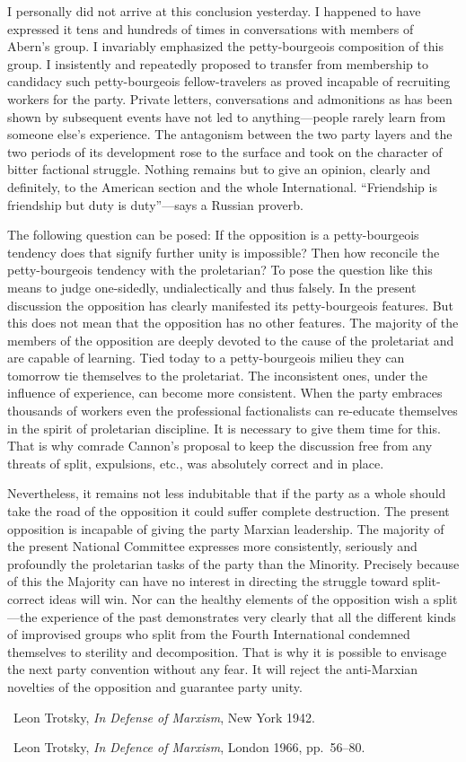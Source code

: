 I personally did not arrive at this conclusion yesterday. I happened to have expressed it tens and hundreds of times in conversations with members of Abern’s group. I invariably emphasized the petty-bourgeois composition of this group. I insistently and repeatedly proposed to transfer from membership to candidacy such petty-bourgeois fellow-travelers as proved incapable of recruiting workers for the party. Private letters, conversations and admonitions as has been shown by subsequent events have not led to anything---people rarely learn from someone else’s experience. The antagonism between the two party layers and the two periods of its development rose to the surface and took on the character of bitter factional struggle. Nothing remains but to give an opinion, clearly and definitely, to the American section and the whole International. “Friendship is friendship but duty is duty”---says a Russian proverb.

The following question can be posed: If the opposition is a petty-bourgeois tendency does that signify further unity is impossible? Then how reconcile the petty-bourgeois tendency with the proletarian? To pose the question like this means to judge one-sidedly, undialectically and thus falsely. In the present discussion the opposition has clearly manifested its petty-bourgeois features. But this does not mean that the opposition has no other features. The majority of the members of the opposition are deeply devoted to the cause of the proletariat and are capable of learning. Tied today to a petty-bourgeois milieu they can tomorrow tie themselves to the proletariat. The inconsistent ones, under the influence of experience, can become more consistent. When the party embraces thousands of workers even the professional factionalists can re-educate themselves in the spirit of proletarian discipline. It is necessary to give them time for this. That is why comrade Cannon’s proposal to keep the discussion free from any threats of split, expulsions, etc., was absolutely correct and in place.

Nevertheless, it remains not less indubitable that if the party as a whole should take the road of the opposition it could suffer complete destruction. The present opposition is incapable of giving the party Marxian leadership. The majority of the present National Committee expresses more consistently, seriously and profoundly the proletarian tasks of the party than the Minority. Precisely because of this the Majority can have no interest in directing the struggle toward split-correct ideas will win. Nor can the healthy elements of the opposition wish a split---the experience of the past demonstrates very clearly that all the different kinds of improvised groups who split from the Fourth International condemned themselves to sterility and decomposition. That is why it is possible to envisage the next party convention without any fear. It will reject the anti-Marxian novelties of the opposition and guarantee party unity.

\begin{letterinfo}
  \firstpublished\ Leon Trotsky, \emph{In Defense of Marxism}, New York 1942.
  
  \checkedagainst\ Leon Trotsky, \emph{In Defence of Marxism}, London 1966, pp.~56--80.
\end{letterinfo}
